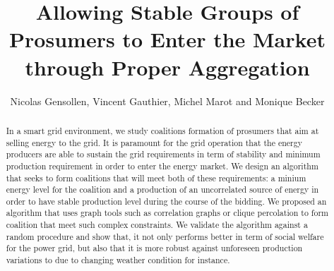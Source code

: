 \documentclass[conference]{IEEEtran}
\begin{document}
%
%
\title{Allowing Stable Groups of Prosumers to Enter the Market through Proper Aggregation}

%
%
\author{Nicolas Gensollen, Vincent Gauthier, Michel Marot and Monique Becker \\
}

\maketitle

%
%
\begin{abstract}
In a smart grid environment, we study coalitions formation of prosumers that aim at selling energy to the grid. It is paramount for the grid operation that the energy producers are able to sustain the grid requirements in term of stability and minimum production requirement in order to enter the energy market. We design an algorithm that seeks to form coalitions that will meet both of these requirements:  a minium energy level for the coalition and a production of an uncorrelated source of energy in order to have stable production level during the course of the bidding. We proposed an algorithm that uses graph tools such as correlation graphs or clique percolation to form coalition that meet such complex constraints. We validate the algorithm against a random procedure and show that, it not only performs better in term of social welfare for the power grid, but also that it is more robust against unforeseen production variations to due to changing weather condition for instance. 
\end{abstract}

\IEEEpeerreviewmaketitle


%
%
\end{document}
